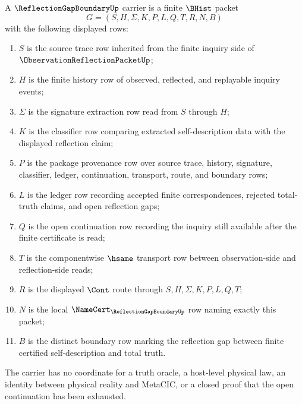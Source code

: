 \begin{definition}
\label{def:reflection-gap-boundary-carrier}
A $\ReflectionGapBoundaryUp$ carrier is a finite $\BHist$ packet
$$
G=(S,H,\Sigma,K,P,L,Q,T,R,N,B)
$$
with the following displayed rows:
\begin{enumerate}
\item $S$ is the source trace row inherited from the finite inquiry side of $\ObservationReflectionPacketUp$;
\item $H$ is the finite history row of observed, reflected, and replayable inquiry events;
\item $\Sigma$ is the signature extraction row read from $S$ through $H$;
\item $K$ is the classifier row comparing extracted self-description data with the displayed reflection claim;
\item $P$ is the package provenance row over source trace, history, signature, classifier, ledger, continuation, transport, route, and boundary rows;
\item $L$ is the ledger row recording accepted finite correspondences, rejected total-truth claims, and open reflection gaps;
\item $Q$ is the open continuation row recording the inquiry still available after the finite certificate is read;
\item $T$ is the componentwise $\hsame$ transport row between observation-side and reflection-side reads;
\item $R$ is the displayed $\Cont$ route through $S,H,\Sigma,K,P,L,Q,T$;
\item $N$ is the local $\NameCert_{\ReflectionGapBoundaryUp}$ row naming exactly this packet;
\item $B$ is the distinct boundary row marking the reflection gap between finite certified self-description and total truth.
\end{enumerate}
The carrier has no coordinate for a truth oracle, a host-level physical law, an identity between physical reality and MetaCIC, or a closed proof that the open continuation has been exhausted.
\end{definition}

